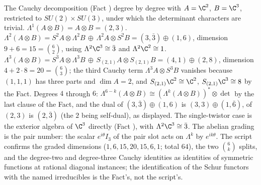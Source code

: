 The Cauchy decomposition (Fact ) degree by degree with $A = \C^{2}$, $B = \C^{3}$, restricted to $SU(2) \times SU(3)$, under which the determinant characters are trivial. $\Lambda^{1}(A \otimes B) = A \otimes B = (2,3)$. $\Lambda^{2}(A \otimes B) = S^{2}A \otimes \Lambda^{2}B \,\oplus\, \Lambda^{2}A \otimes S^{2}B = (3, \bar{3}) \oplus (1, 6)$, dimension $9 + 6 = 15 = \binom{6}{2}$, using $\Lambda^{2}\C^{3} \cong \bar{3}$ and $\Lambda^{2}\C^{2} \cong 1$. $\Lambda^{3}(A \otimes B) = S^{3}A \otimes \Lambda^{3}B \,\oplus\, S_{(2,1)}A \otimes S_{(2,1)}B = (4, 1) \oplus (2, 8)$, dimension $4 + 2\cdot 8 = 20 = \binom{6}{3}$; the third Cauchy term $\Lambda^{3}A \otimes S^{3}B$ vanishes because $(1,1,1)$ has three parts and $\dim A = 2$, and $S_{(2,1)}\C^{2} \cong \C^{2}$, $S_{(2,1)}\C^{3} \cong 8$ by the Fact. Degrees $4$ through $6$: $\Lambda^{6-k}(A \otimes B) \cong (\Lambda^{k}(A \otimes B))^{*} \otimes \det$ by the last clause of the Fact, and the dual of $(3, \bar{3}) \oplus (1, 6)$ is $(3, 3) \oplus (1, \bar{6})$, of $(2, 3)$ is $(2, \bar{3})$ (the $2$ being self-dual), as displayed. The single-twistor case is the exterior algebra of $\C^{3}$ directly (Fact ), with $\Lambda^{2}\C^{3} \cong \bar{3}$. The abelian grading is the pair number: the scalar $e^{i\theta}I_{3}$ of the pair slot acts on $\Lambda^{k}$ by $e^{ik\theta}$. The script confirms the graded dimensions ($1, 6, 15, 20, 15, 6, 1$; total $64$), the two $\binom{6}{k}$ splits, and the degree-two and degree-three Cauchy identities as identities of symmetric functions at rational diagonal instances; the identification of the Schur functors with the named irreducibles is the Fact's, not the script's.
